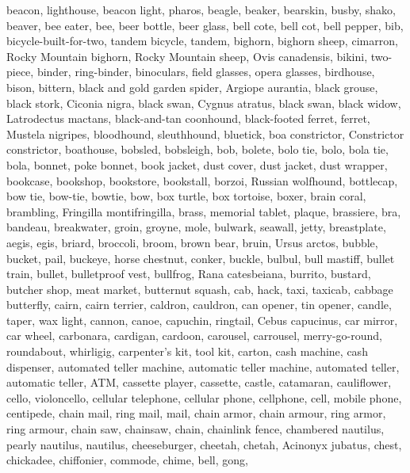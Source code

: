 \documentclass{article}
\begin{document}
{{beacon, lighthouse, beacon light, pharos},
{beagle},
{beaker},
{bearskin, busby, shako},
{beaver},
{bee eater},
{bee},
{beer bottle},
{beer glass},
{bell cote, bell cot},
{bell pepper},
{bib},
{bicycle-built-for-two, tandem bicycle, tandem},
{bighorn, bighorn sheep, cimarron, Rocky Mountain bighorn, Rocky Mountain sheep, Ovis canadensis},
{bikini, two-piece},
{binder, ring-binder},
{binoculars, field glasses, opera glasses},
{birdhouse},
{bison},
{bittern},
{black and gold garden spider, Argiope aurantia},
{black grouse},
{black stork, Ciconia nigra},
{black swan, Cygnus atratus},
{black swan},
{black widow, Latrodectus mactans},
{black-and-tan coonhound},
{black-footed ferret, ferret, Mustela nigripes},
{bloodhound, sleuthhound},
{bluetick},
{boa constrictor, Constrictor constrictor},
{boathouse},
{bobsled, bobsleigh, bob},
{bolete},
{bolo tie, bolo, bola tie, bola},
{bonnet, poke bonnet},
{book jacket, dust cover, dust jacket, dust wrapper},
{bookcase},
{bookshop, bookstore, bookstall},
{borzoi, Russian wolfhound},
{bottlecap},
{bow tie, bow-tie, bowtie},
{bow},
{box turtle, box tortoise},
{boxer},
{brain coral},
{brambling, Fringilla montifringilla},
{brass, memorial tablet, plaque},
{brassiere, bra, bandeau},
{breakwater, groin, groyne, mole, bulwark, seawall, jetty},
{breastplate, aegis, egis},
{briard},
{broccoli},
{broom},
{brown bear, bruin, Ursus arctos},
{bubble},
{bucket, pail},
{buckeye, horse chestnut, conker},
{buckle},
{bulbul},
{bull mastiff},
{bullet train, bullet},
{bulletproof vest},
{bullfrog, Rana catesbeiana},
{burrito},
{bustard},
{butcher shop, meat market},
{butternut squash},
{cab, hack, taxi, taxicab},
{cabbage butterfly},
{cairn, cairn terrier},
{caldron, cauldron},
{can opener, tin opener},
{candle, taper, wax light},
{cannon},
{canoe},
{capuchin, ringtail, Cebus capucinus},
{car mirror},
{car wheel},
{carbonara},
{cardigan},
{cardoon},
{carousel, carrousel, merry-go-round, roundabout, whirligig},
{carpenter's kit, tool kit},
{carton},
{cash machine, cash dispenser, automated teller machine, automatic teller machine, automated teller, automatic teller, ATM},
{cassette player},
{cassette},
{castle},
{catamaran},
{cauliflower},
{cello, violoncello},
{cellular telephone, cellular phone, cellphone, cell, mobile phone},
{centipede},
{chain mail, ring mail, mail, chain armor, chain armour, ring armor, ring armour},
{chain saw, chainsaw},
{chain},
{chainlink fence},
{chambered nautilus, pearly nautilus, nautilus},
{cheeseburger},
{cheetah, chetah, Acinonyx jubatus},
{chest},
{chickadee},
{chiffonier, commode},
{chime, bell, gong},
}
\end{document}
